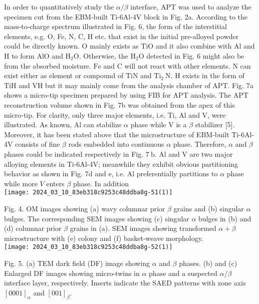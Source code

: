 \documentclass[10pt]{article}
\begin{document}
In order to quantitatively study the $\alpha / \beta$ interface, APT was used to analyze the specimen cut from the EBM-built Ti-6Al-4V block in Fig. 2a. According to the mass-to-charge spectrum illustrated in Fig. 6, the form of the interstitial elements, e.g. O, Fe, N, C, H etc. that exist in the initial pre-alloyed powder could be directly known. $\mathrm{O}$ mainly exists as $\mathrm{TiO}$ and it also combine with $\mathrm{Al}$ and $\mathrm{H}$ to form $\mathrm{AlO}$ and $\mathrm{H}_{2} \mathrm{O}$. Otherwise, the $\mathrm{H}_{2} \mathrm{O}$ detected in Fig. 6 might also be from the absorbed moisture. $\mathrm{Fe}$ and $\mathrm{C}$ will not react with other elements. $\mathrm{N}$ can exist either as element or compound of $\mathrm{TiN}$ and $\mathrm{Ti}_{2} \mathrm{~N}$. $\mathrm{H}$ exists in the form of $\mathrm{TiH}$ and $\mathrm{VH}$ but it may mainly come from the analysis chamber of APT. Fig. 7a shows a micro-tip specimen prepared by using FIB for APT analysis. The APT reconstruction volume shown in Fig. 7b was obtained from the apex of this micro-tip. For clarity, only three major elements, i.e. Ti, Al and $\mathrm{V}$, were illustrated. As known, Al can stabilize $\alpha$ phase while $\mathrm{V}$ is a $\beta$ stabilizer [5]. Moreover, it has been stated above that the microstructure of EBM-built Ti-6Al-4V consists of fine $\beta$ rods embedded into continuous $\alpha$ phase. Therefore, $\alpha$ and $\beta$ phases could be indicated respectively in Fig. $7 \mathrm{~b}$. $\mathrm{Al}$ and $\mathrm{V}$ are two major alloying elements in Ti-6Al-4V; meanwhile they exhibit obvious partitioning behavior as shown in Fig. 7d and e, i.e. Al preferentially partitions to $\alpha$ phase while more $V$ enters $\beta$ phase. In addition\\
\texttt{[image: 2024\_03\_10\_83eb318c9253c48ddba8g-51(1)]}

Fig. 4. OM images showing (a) wavy columnar prior $\beta$ grains and (b) singular $\alpha$ bulges. The corresponding SEM images showing (c) singular $\alpha$ bulges in (b) and (d) columnar prior $\beta$ grains in (a). SEM images showing transformed $\alpha+\beta$ microstructure with (e) colony and (f) basket-weave morphology.\\
\texttt{[image: 2024\_03\_10\_83eb318c9253c48ddba8g-52(1)]}

Fig. 5. (a) TEM dark field (DF) image showing $\alpha$ and $\beta$ phases. (b) and (c) Enlarged DF images showing micro-twins in $\alpha$ phase and a suspected $\alpha / \beta$ interface layer, respectively. Inserts indicate the SAED patterns with zone axis $[0001]_{\alpha}$ and $[001]_{\beta}$.
\end{document}
